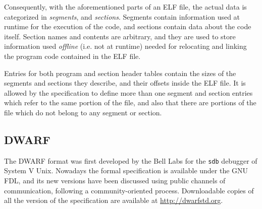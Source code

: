 Consequently, with the aforementioned parts of an ELF file, the actual data is
categorized in \emph{segments}, and \emph{sections}. Segments contain
information used at runtime for the execution of the code, and sections
contain data about the code itself. Section names and contents are arbitrary,
and they are used to store information used \emph{offline} (i.e. not at
runtime) needed for relocating and linking the program code contained in the
ELF file.

Entries for both program and section header tables contain the sizes of the
segments and sections they describe, and their offsets inside the ELF file. It
is allowed by the specification to define more than one segment and section
entries which refer to the same portion of the file, and also that there are
portions of the file which do not belong to any segment or section.


\subsection{DWARF}

%
%
%
%
%	
%

The \gls{DWARF} format was first developed by the Bell Labs for the
\verb|sdb| debugger of System V Unix. Nowadays the formal specification
is available under the GNU \gls{FDL}, and its new versions have been
discussed using public channels of communication, following a
community-oriented process. Downloadable copies of all the version of
the specification are available at {\small\url{http://dwarfstd.org}}.

